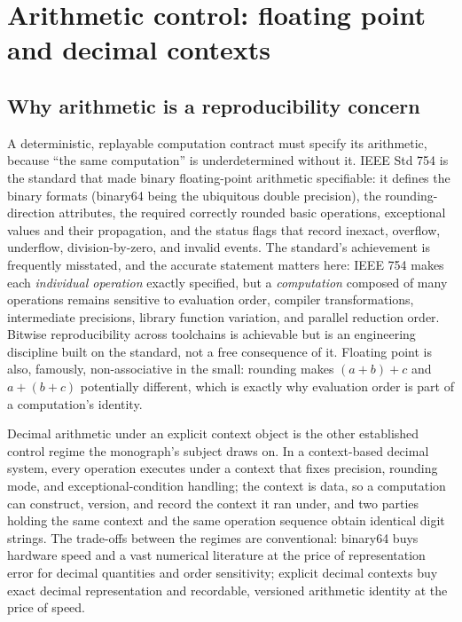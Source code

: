 \section{Arithmetic control: floating point and decimal contexts}\label{ch02:arith}

\subsection{Why arithmetic is a reproducibility concern}\label{ch02:arith:why}

A deterministic, replayable computation contract must specify its
arithmetic, because ``the same computation'' is underdetermined without
it. IEEE Std 754 \cite{ieee754} is the standard that made binary
floating-point arithmetic specifiable: it defines the binary formats
(binary64 being the ubiquitous double precision), the rounding-direction
attributes, the required correctly rounded basic operations, exceptional
values and their propagation, and the status flags that record inexact,
overflow, underflow, division-by-zero, and invalid events. The standard's achievement is
frequently misstated, and the accurate statement matters here: IEEE 754
makes each \emph{individual operation} exactly specified, but a
\emph{computation} composed of many operations remains sensitive to
evaluation order, compiler transformations, intermediate precisions,
library function variation, and parallel reduction order. Bitwise
reproducibility across toolchains is achievable but is an engineering
discipline built on the standard, not a free consequence of it. Floating
point is also, famously, non-associative in the small: rounding makes
$(a+b)+c$ and $a+(b+c)$ potentially different, which is exactly why
evaluation order is part of a computation's identity.

Decimal arithmetic under an explicit context object is the other
established control regime the monograph's subject draws on. In a
context-based decimal system, every operation executes under a context
that fixes precision, rounding mode, and exceptional-condition handling;
the context is data, so a computation can construct, version, and record
the context it ran under, and two parties holding the same context and
the same operation sequence obtain identical digit strings. The
trade-offs between the regimes are conventional: binary64 buys hardware
speed and a vast numerical literature at the price of representation
error for decimal quantities and order sensitivity; explicit decimal
contexts buy exact decimal representation and recordable, versioned
arithmetic identity at the price of speed.

